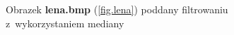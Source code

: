 \documentclass{classrep}
\begin{document}
\begin{figure}
{{  \label{fig.lena_median_5x5}
 }
}
\caption{Obrazek \textbf{lena.bmp} (\ref{fig.lena}) poddany filtrowaniu z~wykorzystaniem mediany}
\label{fig.lena_median}
\end{figure}

\end{document}
